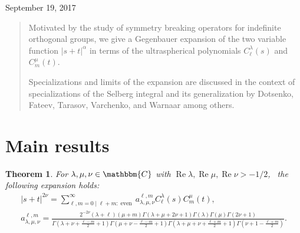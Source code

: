 \documentclass{article}
\numberwithin{equation}{section}
\newcommand{\tmop}[1]{\ensuremath{\operatorname{#1}}}
\newtheorem{theorem}[corollary]{Theorem}
\newcommand{\mygrammarfootnote}[1]{}
\begin{document}
September 19, 2017

\begin{abstract}
  Motivated by the study of symmetry breaking operators for indefinite
  orthogonal groups, we give a Gegenbauer expansion of the two variable
  function $| s + t |^{\alpha}$ in terms of the ultraspherical polynomials
  $C_{\ell}^{\lambda} (s)$ and $C^{\mu}_m (t)$.
  
  Specializations and limits of the expansion are discussed in the context of
  specializations of the Selberg integral and its
  generalization\mygrammarfootnote{maybe, ``generalization'' should be in plural (i.e.
  ``generalizations'')?} by Dotsenko, Fateev, Tarasov, Varchenko, and Warnaar
  among others.
\end{abstract}

\section{Main results}

\begin{theorem}
  For $\lambda, \mu, \nu \in \mathbbm{C}$ with $\tmop{Re} \lambda, \tmop{Re}
  \mu, \tmop{Re} \nu > - 1 / 2$, \ the following expansion holds:
  \begin{eqnarray}
    & | s + t |^{2 \nu} = \sum_{\ell, m = 0 \mid \ell + m :
    \tmop{even}}^{\infty} a_{\lambda, \mu, \nu}^{\ell, m} C_{\ell}^{\lambda}
    (s) C_m^{\mu} (t), &  \nonumber\\
    & a_{\lambda, \mu, \nu}^{\ell, m} = \frac{2^{- 2 \nu} (\lambda + \ell)
    (\mu + m) \Gamma (\lambda + \mu + 2 \nu + 1) \Gamma (\lambda) \Gamma (\mu)
    \Gamma (2 \nu + 1)}{\Gamma \left( \lambda + \nu + \frac{\ell - m}{2} + 1
    \right) \Gamma \left( \mu + \nu - \frac{\ell - m}{2} + 1 \right) \Gamma
    \left( \lambda + \mu + \nu + \frac{\ell + m}{2} + 1 \right) \Gamma \left(
    \nu + 1 - \frac{\ell + m}{2} \right)} . &  \nonumber
  \end{eqnarray}
\end{theorem}
\end{document}
